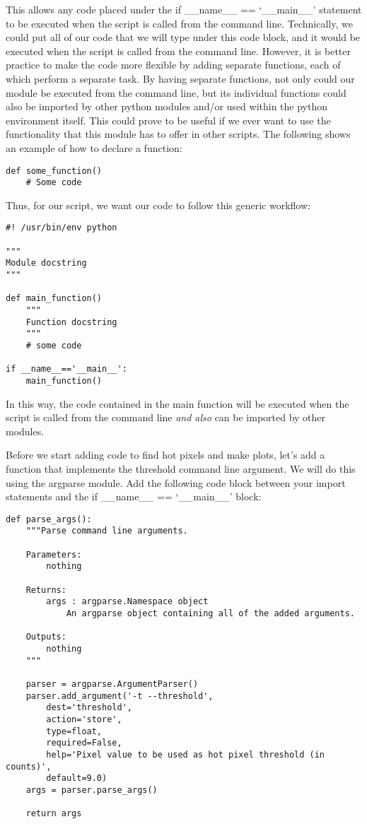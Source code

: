 This allows any code placed under the {\sf\small if \_\_name\_\_ == `\_\_main\_\_'} statement 
to be executed when the script is called from the command line.  Technically, we could 
put all of our code that we will type under this code block, 
and it would be executed when the script is called from the command line.  
However, it is better practice to make the code more flexible by adding separate 
functions, each of which perform a separate task.  By having separate functions, not only 
could our module be executed from the command line, but its individual functions could also be 
imported by other python modules and/or used within the python environment itself. 
This could prove to be useful if we ever want to use the functionality that this module has to 
offer in other scripts.  The following shows an example of how to declare a function:

\begin{verbatim}
def some_function()
    # Some code
\end{verbatim}

Thus, for our script, we want our code to follow this generic workflow:

\begin{verbatim}
#! /usr/bin/env python

"""
Module docstring
"""

def main_function()
    """
    Function docstring
    """
    # some code

if __name__=='__main__':
    main_function()
\end{verbatim}

In this way, the code contained in the main function will be executed when the script is
called from the command line \textit{and also} can be imported by other modules.

Before we start adding code to find hot pixels and make plots, let's add a function
that implements the threshold command line argument.  We will do this using the {\sf\small argparse}
module.  Add the following code block between your import statements and the {\sf\small if \_\_name\_\_ == `\_\_main\_\_'}
block:

\begin{verbatim}
def parse_args():
    """Parse command line arguments.

    Parameters:
        nothing

    Returns:
        args : argparse.Namespace object
            An argparse object containing all of the added arguments.

    Outputs:
        nothing
    """

    parser = argparse.ArgumentParser()
    parser.add_argument('-t --threshold',
        dest='threshold',
        action='store',
        type=float,
        required=False,
        help='Pixel value to be used as hot pixel threshold (in counts)',
        default=9.0)
    args = parser.parse_args()

    return args
\end{verbatim}

